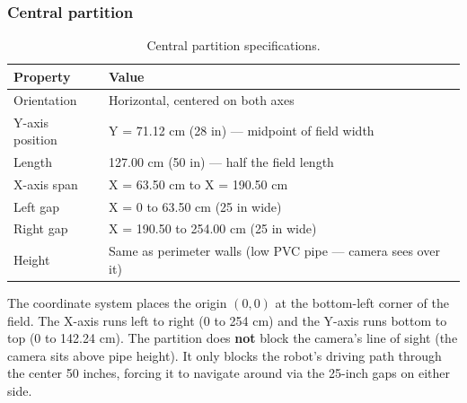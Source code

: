 \documentclass[a4]{article}
\begin{document}
\subsubsection*{Central partition}

\begin{table}[H]
\centering
\begin{tabular}{ll}
\toprule
\textbf{Property} & \textbf{Value} \\
\midrule
Orientation & Horizontal, centered on both axes \\
Y-axis position & Y = 71.12 cm (28 in) --- midpoint of field width \\
Length & 127.00 cm (50 in) --- half the field length \\
X-axis span & X = 63.50 cm to X = 190.50 cm \\
Left gap & X = 0 to 63.50 cm (25 in wide) \\
Right gap & X = 190.50 to 254.00 cm (25 in wide) \\
Height & Same as perimeter walls (low PVC pipe --- camera sees over it) \\
\bottomrule
\end{tabular}
\caption{Central partition specifications.}
\end{table}

The coordinate system places the origin $(0, 0)$ at the bottom-left corner of the field. The X-axis runs left to right (0 to 254 cm) and the Y-axis runs bottom to top (0 to 142.24 cm). The partition does \textbf{not} block the camera's line of sight (the camera sits above pipe height). It only blocks the robot's driving path through the center 50 inches, forcing it to navigate around via the 25-inch gaps on either side.
\end{document}
